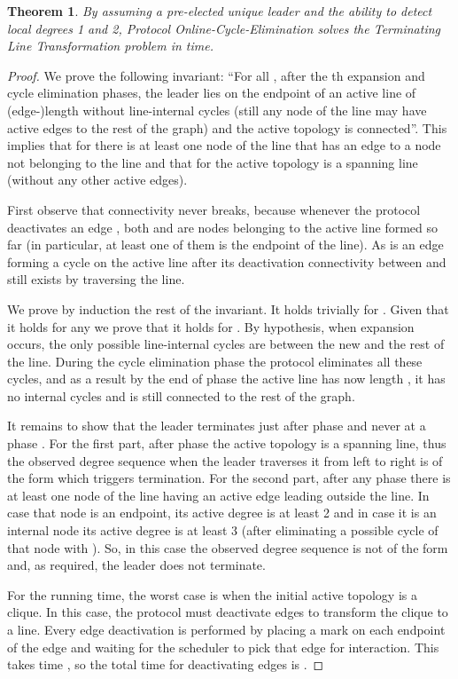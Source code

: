 \documentclass[preprint]{elsarticle}
\newtheorem{theorem}{Theorem}
\begin{document}
\begin{theorem}
By assuming a pre-elected unique leader and the ability to detect local degrees 1 and 2, Protocol Online-Cycle-Elimination solves the Terminating Line Transformation problem in  time.
\end{theorem}
\begin{proof}
We prove the following invariant: ``For all , after the th expansion and cycle elimination phases, the leader lies on the  endpoint of an active line of (edge-)length  without line-internal cycles (still any node of the line may have active edges to the rest of the graph) and the active topology is connected''. This implies that for  there is at least one node of the line that has an edge to a node not belonging to the line and that for  the active topology is a spanning line (without any other active edges). 

First observe that connectivity never breaks, because whenever the protocol deactivates an edge , both  and  are nodes belonging to the active line formed so far (in particular, at least one of them is the  endpoint of the line). As  is an edge forming a cycle on the active line after its deactivation connectivity between  and  still exists by traversing the line.

We prove by induction the rest of the invariant. It holds trivially for . Given that it holds for any  we prove that it holds for . By hypothesis, when expansion  occurs, the only possible line-internal cycles are between the new  and the rest of the line. During the cycle elimination phase the protocol eliminates all these cycles, and as a result by the end of phase  the active line has now length , it has no internal cycles and is still connected to the rest of the graph. 

It remains to show that the leader terminates just after phase  and never at a phase . For the first part, after phase  the active topology is a spanning line, thus the observed degree sequence when the leader traverses it from left to right is of the form  which triggers termination. For the second part, after any phase  there is at least one node of the line having an active edge leading outside the line. In case that node is an endpoint, its active degree is at least 2 and in case it is an internal node its active degree is at least 3 (after eliminating a possible cycle of that node with ). So, in this case the observed degree sequence is not of the form  and, as required, the leader does not terminate.

For the running time, the worst case is when the initial active topology is a clique. In this case, the protocol must deactivate  edges to transform the clique to a line. Every edge deactivation is performed by placing a mark on each endpoint of the edge and waiting for the scheduler to pick that edge for interaction. This takes time , so the total time for deactivating  edges is .
\end{proof}
\end{document}
